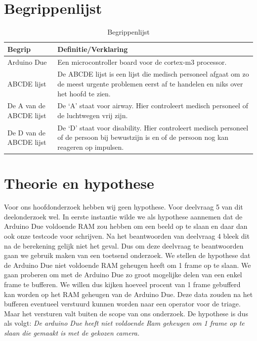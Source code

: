 \documentclass{article}
\begin{document}
\begin{table}[H]
	\centering
	\section{Begrippenlijst}
	\begin{tabular}{ |p{2cm}|p{10cm}| } 
			
		\hline 
		\textbf{Begrip} 		& \textbf{Definitie/Verklaring} \\
		\hline
		\hline

		Arduino Due 			& Een microcontroller board voor de cortex-m3 processor. \\ 
		
		\hline

		ABCDE lijst 			& De ABCDE lijst is een lijst die medisch personeel afgaat om zo de meest urgente problemen eerst af te handelen en niks over het hoofd te zien. \\
		
		\hline
		
		De A van de ABCDE lijst & De ‘A’ staat voor airway. Hier controleert medisch personeel of de luchtwegen vrij zijn. \\
		
		\hline
		
		De D van de ABCDE lijst & De ‘D’ staat voor disability. Hier controleert medisch personeel of de persoon bij bewustzijn is en of de persoon nog kan reageren op impulsen. \\
		
		\hline
	 
		\end{tabular}
		\caption{Begrippenlijst}
		\label{table:1}
	\end{table}

\section{Theorie en hypothese}
Voor ons hoofdonderzoek hebben wij geen hypothese. Voor deelvraag 5 van dit deelonderzoek wel. In eerste instantie wilde we als hypothese aannemen dat de Arduino Due voldoende RAM zou hebben om een beeld op te slaan en daar dan ook onze testcode voor schrijven. Na het beantwoorden van deelvraag 4 bleek dit na de berekening gelijk niet het geval. Dus om deze deelvraag te beantwoorden gaan we gebruik maken van een toetsend onderzoek. We stellen de hypothese dat de Arduino Due niet voldoende RAM geheugen heeft om 1 frame op te slaan. 
We gaan proberen om met de Arduino Due zo groot mogelijke delen van een enkel frame te bufferen. We willen dus kijken hoeveel procent van 1 frame gebufferd kan worden op het RAM geheugen van de Arduino Due. Deze data zouden na het bufferen eventueel verstuurd kunnen worden naar een operator voor de triage. Maar het versturen valt buiten de scope van ons onderzoek. 
De hypothese is dus als volgt: \textit{De arduino Due heeft niet voldoende Ram geheugen om 1 frame op te slaan die gemaakt is met de gekozen camera.}
\end{document}
